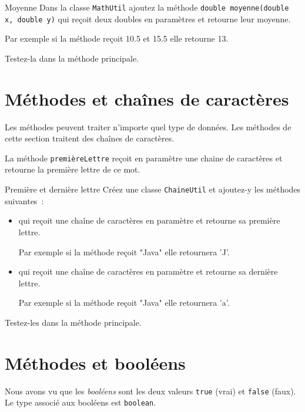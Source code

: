 \documentclass[a4paper,11pt]{article}
\begin{document}
		

	 \begin{Exercice}{Moyenne}
		Dans la classe \texttt{MathUtil} ajoutez la méthode 
		\texttt{double moyenne(double x, double y)} qui reçoit deux doubles en paramètres et retourne leur moyenne.
		
		Par exemple si la méthode reçoit 10.5 et 15.5 elle retourne 13.
		
		Testez-la dans la méthode principale.
	\end{Exercice} 

\section{Méthodes et chaînes de caractères}

	Les méthodes peuvent traiter n'importe quel type de données.
	Les méthodes de cette section traitent des chaînes de caractères. 


	La méthode \texttt{premièreLettre} reçoit en paramètre une chaine de caractères et retourne la première lettre de ce mot.

	\begin{Exercice}{Première et dernière lettre}
		Créez une classe \texttt{ChaineUtil} et ajoutez-y les méthodes suivantes~: 
		\begin{itemize}
			\item {} 
				qui reçoit une chaîne de caractères en paramètre et retourne sa première lettre.
				
				Par exemple si la méthode reçoit "Java" elle retournera 'J'.
			\item {} 
				qui reçoit une chaîne de caractères en paramètre et retourne sa dernière lettre.
				
				Par exemple si la méthode reçoit "Java" elle retournera 'a'.
		\end{itemize}
		
		Testez-les dans la méthode principale.
	\end{Exercice} 



\section{Méthodes et booléens}

	Nous avons vu que les \emph{booléens} sont les deux valeurs \texttt{true} (vrai) et \texttt{false} (faux). 
	Le type associé aux booléens est \texttt{boolean}.
	
\end{document}
